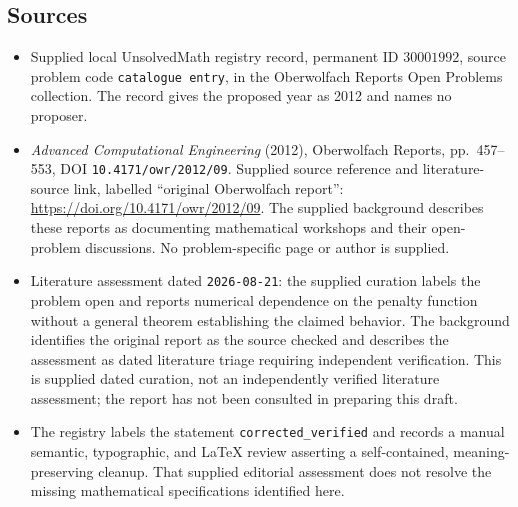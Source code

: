 \documentclass[11pt]{article}
\begin{document}
\subsection{Sources}
\begin{itemize}
\item Supplied local UnsolvedMath registry record, permanent ID \(30001992\), source problem code \texttt{catalogue entry}, in the Oberwolfach Reports Open Problems collection. The record gives the proposed year as 2012 and names no proposer.
\item \emph{Advanced Computational Engineering} (2012), Oberwolfach Reports, pp.~457--553, DOI \texttt{10.4171/owr/2012/09}. Supplied source reference and literature-source link, labelled ``original Oberwolfach report'': \url{https://doi.org/10.4171/owr/2012/09}. The supplied background describes these reports as documenting mathematical workshops and their open-problem discussions. No problem-specific page or author is supplied.
\item Literature assessment dated \texttt{2026-08-21}: the supplied curation labels the problem open and reports numerical dependence on the penalty function without a general theorem establishing the claimed behavior. The background identifies the original report as the source checked and describes the assessment as dated literature triage requiring independent verification. This is supplied dated curation, not an independently verified literature assessment; the report has not been consulted in preparing this draft.
\item The registry labels the statement \texttt{corrected\_verified} and records a manual semantic, typographic, and LaTeX review asserting a self-contained, meaning-preserving cleanup. That supplied editorial assessment does not resolve the missing mathematical specifications identified here.
\end{itemize}
\end{document}
